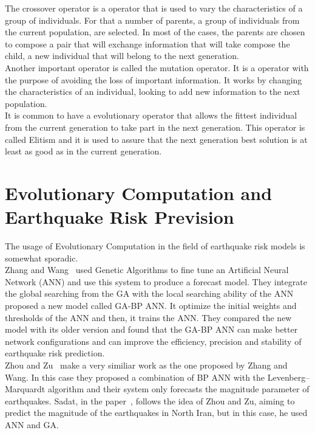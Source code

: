 The crossover operator is a operator that is used to vary the characteristics of a group of individuals. For that a number of parents, a group of individuals from the current population, are selected. In most of the cases, the parents are chosen to compose a pair that will exchange information that will take compose the child, a new individual that will belong to the next generation.\\

Another important operator is called the mutation operator. It is a operator with the purpose of avoiding the loss of important information. It works by changing the characteristics of an individual, looking to add new information to the next population.\\

It is common to have a evolutionary operator that allows the fittest individual from the current generation to take part in the next generation. This operator is called Elitism and it is used to assure that the next generation best solution is at least as good as in the current generation.\\

\section{Evolutionary Computation and Earthquake Risk Prevision}
The usage of Evolutionary Computation in the field of earthquake risk models is somewhat sporadic.\\

Zhang and Wang~\cite{Zhang2012} used Genetic Algorithms to fine tune an Artificial Neural Network (ANN) and use this system to produce a forecast model. They integrate the global searching from the GA with the local searching ability of the ANN proposed a new model called GA-BP ANN. It optimize the initial weights and thresholds of the ANN and then, it trains the ANN. They compared the new model with its older version and found that the GA-BP ANN can make better network configurations and can improve the efficiency, precision and stability of earthquake risk prediction.\\

Zhou and Zu~\cite{Feiyan2014} make a very similiar work as the one proposed by Zhang and Wang. In this case they proposed a combination of BP ANN with the Levenberg–Marquardt algorithm and their system only forecasts the magnitude parameter of earthquakes. Sadat, in the paper~\cite{sadat2015application}, follows the idea of Zhou and Zu, aiming to predict the magnitude of the earthquakes in North Iran, but in this case, he used ANN and GA.\\

